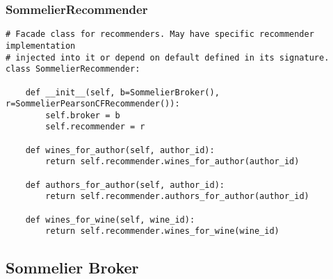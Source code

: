 \subsubsection{SommelierRecommender}

\begin{verbatim}
# Facade class for recommenders. May have specific recommender implementation
# injected into it or depend on default defined in its signature.
class SommelierRecommender:

    def __init__(self, b=SommelierBroker(), r=SommelierPearsonCFRecommender()):
        self.broker = b
        self.recommender = r

    def wines_for_author(self, author_id):
        return self.recommender.wines_for_author(author_id)

    def authors_for_author(self, author_id):
        return self.recommender.authors_for_author(author_id)

    def wines_for_wine(self, wine_id):
        return self.recommender.wines_for_wine(wine_id)

\end{verbatim}

\subsection{Sommelier Broker}


